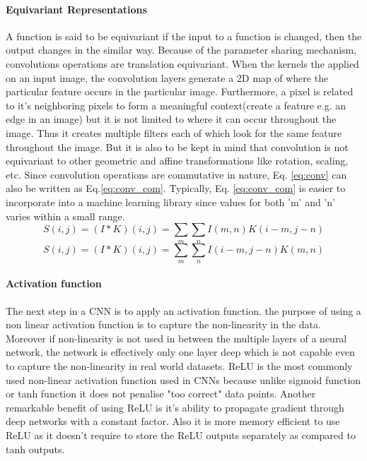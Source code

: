 \paragraph{Equivariant Representations} 
A function is said to be equivariant if the input to a function is changed, then the output changes in the similar way. Because of the parameter sharing mechanism, convolutions operations are translation equivariant. When the kernels the applied on an input image, the convolution layers generate a 2D map of where the particular feature occurs in the particular image. Furthermore, a pixel is related to it's neighboring pixels to form a meaningful context(create a feature e.g. an edge in an image) but it is not limited to where it can occur throughout the image. Thus it creates multiple filters each of which look for the same feature throughout the image. But it is also to be kept in mind that convolution is not equivariant to other geometric and affine transformations like rotation, scaling, etc. 
 Since convolution operations are commutative in nature, Eq. \ref{eq:conv} can also be written as Eq.\ref{eq:conv_com}. Typically, Eq. \ref{eq:conv_com} is easier to incorporate into a machine learning library since values for both 'm' and 'n' varies within a small range.\cite{Goodfellow-et-al-2016}
\begin{equation}
    \label{eq:conv}
    \mathit{S(i,j)}= \mathit{(I*K)(i,j)} = \sum_{m}\sum_{n}\mathit{I(m,n)K(i-m,j-n)}
\end{equation}
\begin{equation}
    \label{eq:conv_com}
    \mathit{S(i,j)}= \mathit{(I*K)(i,j)} = \sum_{m}\sum_{n}\mathit{I(i-m,j-n)K(m,n)}
\end{equation}
\paragraph{Activation function}
The next step in a \ac{CNN} is to apply an activation function. the purpose of using a non linear activation function is to capture the non-linearity in the data. Moreover if non-linearity is not used in between the multiple layers of a neural network, the network is effectively only one layer deep which is not capable even to capture the non-linearity in real world datasets. \ac{ReLU} is the most commonly used non-linear activation function used in \ac{CNN}s because unlike sigmoid function or tanh function it does not penalise "too correct" data points. Another remarkable benefit of using \ac{ReLU} is it's ability to propagate gradient through deep networks with a constant factor. Also it is more memory efficient to use \ac{ReLU} as it doesn't require to store the \ac{ReLU} outputs separately as compared to tanh outputs.
